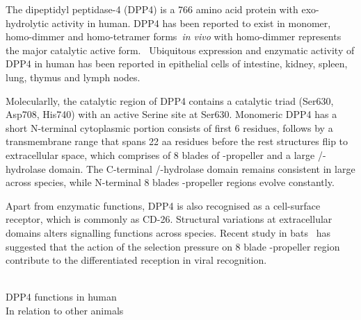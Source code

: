 The dipeptidyl peptidase-4 (DPP4) is a 766 amino acid protein with exo-hydrolytic activity in human. DPP4 has been reported to exist in  monomer, homo-dimmer and homo-tetramer forms~\textit{in vivo} with homo-dimmer represents the major catalytic active form.~\cite{Mulvihill_2014} Ubiquitous expression and enzymatic activity of DPP4 in human has been reported in epithelial cells of intestine, kidney, spleen, lung, thymus and lymph nodes. 

Molecularlly, the catalytic region of DPP4 contains a catalytic triad (Ser630, Asp708, His740) with an active Serine site at Ser630. Monomeric DPP4 has a short N-terminal cytoplasmic portion consists of first 6 residues, follows by a transmembrane range that spans 22 aa residues before the rest structures flip to extracellular space, which comprises of 8 blades of \beta-propeller and a large \alpha/\beta-hydrolase domain. The C-terminal \alpha/\beta-hydrolase domain remains consistent in large across species, while N-terminal 8 blades \beta-propeller regions evolve constantly. 

Apart from enzymatic functions, DPP4 is also recognised as a cell-surface receptor, which is commonly as CD-26. Structural variations at extracellular domains alters signalling functions across species. Recent study in bats~\cite{Letko_2018, Cui_2013} has suggested that the action of the selection pressure on 8 blade \beta-propeller region contribute to the differentiated reception in viral recognition.  

\\
DPP4 functions in human 
\\ 
In relation to other animals 

